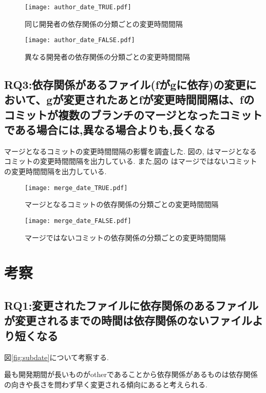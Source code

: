 \documentclass{fose2016}           %
\begin{document}
\begin{figure}
\centering
\texttt{[image: author\_date\_TRUE.pdf]}
\caption{同じ開発者の依存関係の分類ごとの変更時間間隔}
\label{fig:author_true_subdate} 
\end{figure}

\begin{figure}
\centering
\texttt{[image: author\_date\_FALSE.pdf]}
\caption{異なる開発者の依存関係の分類ごとの変更時間間隔}
\label{fig:author_false_subdate} 
\end{figure}


\subsection{RQ3:依存関係があるファイル(fがgに依存)の変更において、gが変更されたあとfが変更時間間隔は、fのコミットが複数のブランチのマージとなったコミットである場合には,異なる場合よりも,長くなる}
マージとなるコミットの変更時間間隔の影響を調査した.
図の,\label{fig:merge_true_subdate} はマージとなるコミットの変更時間間隔を出力している.
また,図の\label{fig:merge_false_subdate} はマージではないコミットの変更時間間隔を出力している.

\begin{figure}
\centering
\texttt{[image: merge\_date\_TRUE.pdf]}
\caption{マージとなるコミットの依存関係の分類ごとの変更時間間隔}
\label{fig:merge_true_subdate} 
\end{figure}

\begin{figure}
\centering
\texttt{[image: merge\_date\_FALSE.pdf]}
\caption{マージではないコミットの依存関係の分類ごとの変更時間間隔}
\label{fig:merge_false_subdate} 
\end{figure}


\section{考察}\label{考察}

\subsection{RQ1:変更されたファイルに依存関係のあるファイルが変更されるまでの時間は依存関係のないファイルより短くなる}
図\ref{fig:subdate}について考察する.

最も開発期間が長いものがotherであることから依存関係があるものは依存関係の向きや長さを問わず早く変更される傾向にあると考えられる.
\end{document}
